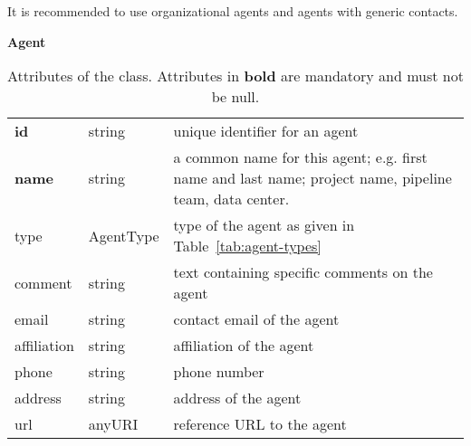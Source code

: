 It is recommended to use organizational agents and agents with generic contacts.


\begin{table}[ht]
\small
{}\textwidth
\textbf{\normalsize Agent}\vspace{0.25em}\\
\begin{tabulary}{1.0\textwidth}{llL}
\toprule
{} &  & \\
\midrule
\textbf{id}    & string & unique identifier for an agent\\
\textbf{name}  & string & a common name for this agent; e.g. first name and last name; project name,  pipeline team, data center.\\
type        & AgentType & type of the agent as given in Table~\ref{tab:agent-types}\\
comment     & string & text containing specific comments on the agent\\
email       & string & contact email of the agent\\
affiliation & string & affiliation of the agent\\
phone       & string & phone number\\
address     & string & address of the agent\\
url         & anyURI & reference URL to the agent\\
\bottomrule
\end{tabulary}
\caption[Attributes of the  class]{Attributes of the  class. Attributes in \textbf{bold} are mandatory and must not be null.}
\label{tab:agent}
\end{table}

